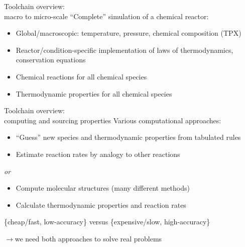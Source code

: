 \begin{frame}{Toolchain overview:\\ macro to micro-scale}
``Complete'' simulation of a chemical reactor:

\vspace{0.5cm}

 \begin{itemize}
  \item Global/macroscopic: temperature, pressure, chemical composition (TPX)
  \item Reactor/condition-specific implementation of laws of thermodynamics, conservation equations
  \item Chemical reactions for all chemical species
  \item Thermodynamic properties for all chemical species
 \end{itemize}
\end{frame}

\begin{frame}{Toolchain overview:\\ computing and sourcing properties}
Various computational approaches:

\vspace{0.5cm}

 \begin{itemize}
  \item ``Guess'' new species and thermodynamic properties from tabulated rules
  \item Estimate reaction rates by analogy to other reactions
 \end{itemize}
 
 \textit{or}
 
 \begin{itemize}
  \item Compute molecular structures (many different methods)
  \item Calculate thermodynamic properties and reaction rates
 \end{itemize}
 
 \vspace{0.5cm}
 
\{cheap/fast, low-accuracy\} versus \{expensive/slow, high-accuracy\}

$\rightarrow$we need both approaches to solve real problems

\end{frame}

